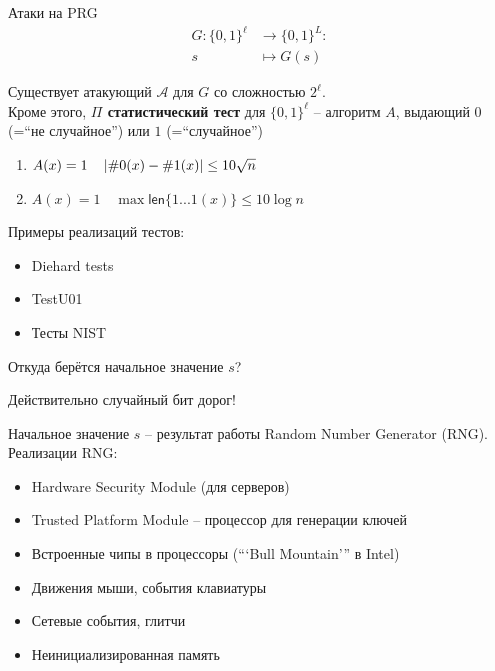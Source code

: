 \documentclass[usenames,dvipsnames,8pt,aspectratio=169]{beamer}
\begin{document}
\begin{frame}{Атаки на PRG}
\Large 
\vspace{-15pt}
\begin{align*}
G : \{0,1\}^{\ell} & \rightarrow \{0,1\}^{L}:	\\
s & \mapsto G(s) 
\end{align*}

Существует атакующий $\mathcal{A}$ для $G$ со сложностью $2^\ell$. \\[10pt]


Кроме этого,  {\color{Orange}\textbf{$\Pi$ статистический тест}} для $\{0,1\}^\ell$ --  алгоритм $A$, выдающий $0$ (=``не случайное'') или $1$ (=``случайное'') \\
\LARGE
\begin{enumerate}
\item $A(x) = 1 \quad \left\lvert\# 0(x) - \# 1(x)\right\rvert \leq 10 \sqrt{n}$  \\ [10pt]
\item $A(x) = 1 \quad \max \mathsf{len}\{1...1(x) \} \leq 10 \log n$  \\ [10pt]
\end{enumerate}

\vspace{4pt}

Примеры реализаций тестов:
\begin{itemize}
\item Diehard tests
\item TestU01
\item Тесты NIST
\end{itemize}

\end{frame}

\begin{frame}{Откуда берётся начальное значение $s$?}
\Large
\begin{center}
	{\color{Orange} Действительно случайный бит дорог!  } \\[5pt]
\end{center}
Начальное значение $s$ -- результат работы Random Number Generator (RNG). \\[20pt]

Реализации RNG:

\begin{itemize}
	\itemsep 5pt
	\item Hardware Security Module (для серверов)
	\item Trusted Platform Module -- процессор для генерации ключей
	\item Встроенные чипы в процессоры (``‘Bull Mountain’'' в Intel)
	\item Движения мыши, события клавиатуры
	\item Сетевые события, глитчи
	\item Неинициализированная память
\end{itemize}
\end{frame}
\end{document}
